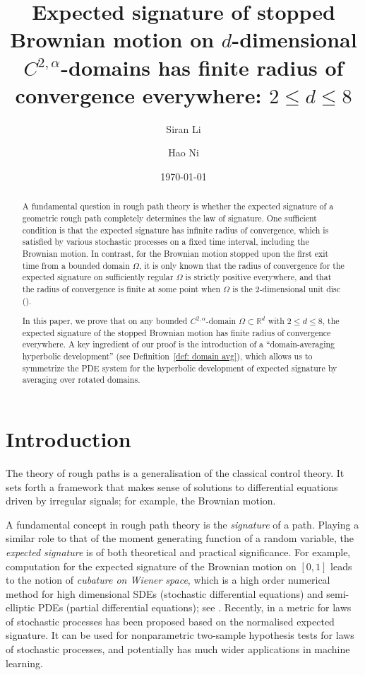 \documentclass[11pt,a4paper,english,reqno]{amsart}
\title{Expected signature of stopped Brownian motion on $d$-dimensional $C^{2, \alpha}$-domains has finite radius of convergence everywhere: $2\leq d \leq 8$}
\author{Siran Li}
\author{Hao Ni}\address{Hao Ni: Department of Mathematics University College, Gower Street, WC1E 6BT, London, UK}
\date{\today}
\theoremstyle{plain}
\newcommand{\R}{\mathbb{R}}
\newcommand{\1}{\mathbbm{1}}
\begin{document}
\begin{abstract}
A fundamental question in rough path theory is whether the expected signature of a geometric rough path completely determines the law of signature. One sufficient condition is that the expected signature has infinite radius of convergence, which is satisfied by various stochastic processes on a fixed time interval, including the Brownian motion. In contrast, for the Brownian motion stopped upon the first exit time from a bounded domain $\Omega$, it is only known that the radius of convergence for the expected signature on sufficiently regular $\Omega$ is strictly positive everywhere, and that  the radius of convergence is finite at some point when $\Omega$ is the $2$-dimensional unit disc  (\cite{boedihardjo2021expected}).


In this paper, we prove that on any bounded $C^{2,\alpha}$-domain $\Omega \subset \R^d$ with $2\leq d \leq 8$, the expected signature of the stopped Brownian motion has finite radius of convergence everywhere. %
A key ingredient of our proof is the introduction of a ``domain-averaging hyperbolic development'' (see Definition~\ref{def: domain avg}), which allows us to symmetrize the PDE system for the hyperbolic development of expected signature by averaging over rotated domains. 
\end{abstract}

\maketitle



\section{Introduction}

The theory of rough paths is a generalisation of the classical control theory. It sets forth a framework that makes sense of solutions to differential equations driven by irregular signals; for example, the Brownian motion. 


A fundamental concept in rough path theory is the \emph{signature} of a path. %
Playing a similar role to that of the moment generating function of a random variable, the \emph{expected signature} is of both theoretical and practical significance. For example, computation for the expected signature of the Brownian motion on $[0, 1]$ leads to the notion of \emph{cubature on Wiener space}, which is a high order numerical method for high dimensional SDEs (stochastic differential equations) and semi-elliptic PDEs (partial differential equations); see \cite{lyons2004cubature}. Recently, in \cite{chevyrev2018signature} a metric for laws of stochastic processes has been proposed based on the normalised expected signature. It can be used for nonparametric two-sample hypothesis tests for laws of stochastic processes, and potentially has much wider applications in machine learning.
\end{document}

